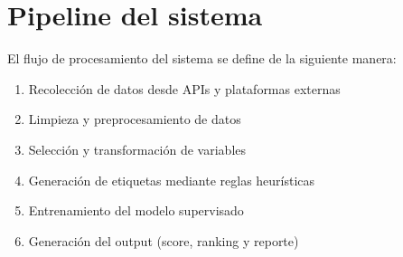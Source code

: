 \documentclass{ULBreport} %
\begin{document}
\section{Pipeline del sistema}

El flujo de procesamiento del sistema se define de la siguiente manera:

\begin{enumerate}
    \item Recolección de datos desde APIs y plataformas externas
    \item Limpieza y preprocesamiento de datos
    \item Selección y transformación de variables
    \item Generación de etiquetas mediante reglas heurísticas
    \item Entrenamiento del modelo supervisado
    \item Generación del output (score, ranking y reporte)
\end{enumerate}
\end{document}
